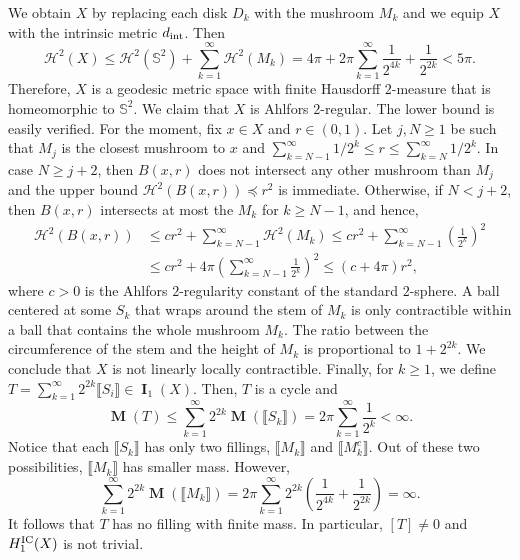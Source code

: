 \documentclass{amsart}
\numberwithin{equation}{section}
\newcommand{\Ha}{\mathcal{H}}
\DeclareMathOperator{\bI}{\mathbf{I}}
\DeclareMathOperator{\bM}{\mathbf{M}}
\newcommand{\bb}[1]{\llbracket #1\rrbracket}
\begin{document}
        We obtain $X$ by replacing each disk $D_k$ with the mushroom $M_k$ and we equip $X$ with the intrinsic metric $d_{\textup{int}}$. Then
        $$\Ha^2(X) \leq \Ha^2(\mathbb{S}^2) + \sum_{k=1}^\infty \Ha^2(M_k) = 4\pi + 2\pi\sum_{k=1}^\infty  \frac{1}{2^{4k}} +\frac{1}{2^{2k}} < 5\pi.$$
        Therefore, $X$ is a geodesic metric space with finite Hausdorff $2$-measure that is homeomorphic to $\mathbb{S}^2$. We claim that $X$ is Ahlfors $2$-regular. The lower bound is easily verified. For the moment, fix $x \in X$ and $r\in (0,1)$. Let $j, N \geq1$ be such that $M_j$ is the closest mushroom to $x$ and $\sum_{k = N-1}^\infty 1/2^{k} \leq r \leq \sum_{k = N}^\infty 1/2^{k}$. In case $N \geq j+2$, then $B(x,r)$ does not intersect any other mushroom than $M_j$ and the upper bound $\Ha^2(B(x,r)) \preceq r^2$ is immediate. Otherwise, if $N < j+2$, then $B(x,r)$ intersects at most the $M_k$ for $k \geq N-1$, and hence,
        \begin{align*}
            \Ha^2(B(x,r)) &\leq cr^2 + \sum_{k=N-1}^\infty \Ha^2(M_k) \leq cr^2  + \sum_{k=N-1}^\infty \left(\frac{1}{2^k}\right)^2
            \\
            &\leq cr^2+ 4\pi\left(\sum_{k=N-1}^\infty \frac{1}{2^k}\right)^2 \leq (c + 4\pi) r^2, 
        \end{align*}
        where $c>0$ is the Ahlfors $2$-regularity constant of the standard $2$-sphere. A ball centered at some $S_k$ that wraps around the stem of $M_k$ is only contractible within a ball that contains the whole mushroom $M_k$. The ratio between the circumference of the stem and the height of $M_k$ is proportional to $1+2^{2k}$. We conclude that $X$ is not linearly locally contractible. Finally, for $k \geq 1$, we define $T = \sum_{k=1}^\infty 2^{2k}\bb{S_i} \in \bI_1(X)$. Then, $T$ is a cycle and
        $$\bM(T) \leq \sum_{k=1}^\infty  2^{2k}\bM(\bb{S_k})= 2\pi \sum_{k=1}^\infty \frac{1}{2^{k}} < \infty.$$
        Notice that each $\bb{S_k}$ has only two fillings, $\bb{M_k}$ and $\bb{M^c_k}$. Out of these two possibilities, $\bb{M_k}$ has smaller mass.
        However, 
        $$\sum_{k=1}^\infty 2^{2k} \bM(\bb{M_k}) = 2\pi \sum_{k=1}^\infty 2^{2k} \left(\frac{1}{2^{4k}} +\frac{1}{2^{2k}}\right) = \infty. $$
        It follows that $T$ has no filling with finite mass. In particular, $[T]\neq 0 $ and $H_1^\textup{IC}(X)$ is not trivial.
\end{document}
